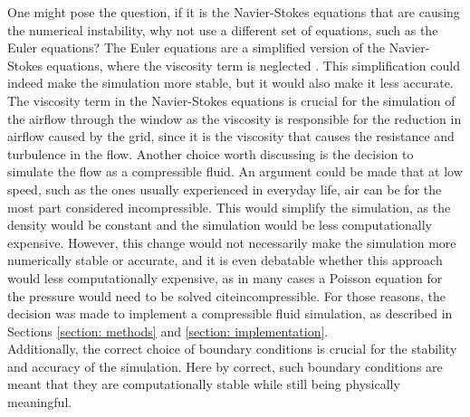 One might pose the question, if it is the Navier-Stokes equations that are causing the numerical instability, why not use a different set of equations, such as the Euler equations? The Euler equations are a simplified version of the Navier-Stokes equations, where the viscosity term is neglected \cite{eulerEqs}. This simplification could indeed make the simulation more stable, but it would also make it less accurate. The viscosity term in the Navier-Stokes equations is crucial for the simulation of the airflow through the window as the viscosity is responsible for the reduction in airflow caused by the grid, since it is the viscosity that causes the resistance and turbulence in the flow. Another choice worth discussing is the decision to simulate the flow as a compressible fluid. An argument could be made that at low speed, such as the ones usually experienced in everyday life, air can be for the most part considered incompressible. This would simplify the simulation, as the density would be constant and the simulation would be less computationally expensive. However, this change would not necessarily make the simulation more numerically stable or accurate, and it is even debatable whether this approach would less computationally expensive, as in many cases a Poisson equation for the pressure would need to be solved cite{incompressible}. For those reasons, the decision was made to implement a compressible fluid simulation, as described in Sections \ref{section: methods} and \ref{section: implementation}. \\

Additionally, the correct choice of boundary conditions is crucial for the stability and accuracy of the simulation. Here by correct, such boundary conditions are meant that they are computationally stable while still being physically meaningful. 
